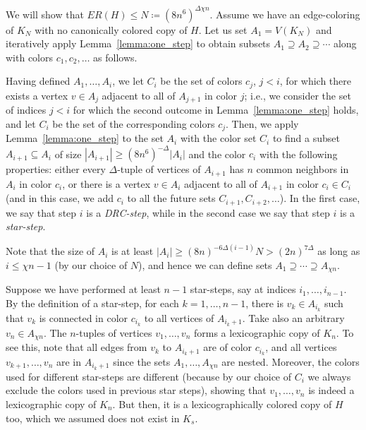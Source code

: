 \documentclass[a4paper,11pt]{article}
\makeatletter
\renewenvironment{proof}[1][\proofname] {\par\pushQED{\qed}\normalfont\topsep6\p@\@plus6\p@\relax\trivlist\item[\hskip\labelsep\bfseries#1\@addpunct{.}]\ignorespaces}{\popQED\endtrivlist\@endpefalse}
\theoremstyle{definition}
\makeatother
\begin{document}
\begin{proof}[Proof of Theorem~\ref{thm:upper bound non-bipartite}.]
We will show that $ER(H)\leq N \coloneqq (8n^6)^{\Delta \chi n}$. Assume we have an edge-coloring of $K_N$ with no canonically colored copy of $H$. Let us set $A_1=V(K_N)$ and iteratively apply Lemma~\ref{lemma:one_step} to obtain subsets $A_1\supseteq A_2\supseteq \cdots$ along with colors $c_1, c_2, \dots$ as follows.

Having defined $A_1, \dots, A_i$, we let $C_i$ be the set of colors $c_{j}$, $j< i$, for which there exists a vertex $v\in A_j$ adjacent to all of $A_{j+1}$ in color $j$; i.e., we consider the set of indices $j < i$ for which the second outcome in Lemma~\ref{lemma:one_step} holds, and let $C_i$ be the set of the corresponding colors $c_j$. Then, we apply Lemma~\ref{lemma:one_step} to the set $A_i$ with the color set $C_i$ to find a subset $A_{i+1}\subseteq A_i$ of size $|A_{i+1}|\geq (8n^6)^{-\Delta} |A_i|$ and the color $c_i$ with the following properties: either every $\Delta$-tuple of vertices of $A_{i+1}$ has $n$ common neighbors in $A_i$ in color $c_i$, or there is a vertex $v\in A_i$ adjacent to all of $A_{i+1}$ in color $c_i\in C_i$ (and in this case, we add $c_i$ to all the future sets $C_{i+1},C_{i+2},\dots$). In the first case, we say that step $i$ is a \textit{DRC-step}, while in the second case we say that step $i$ is a \textit{star-step}.

Note that the size of $A_i$ is at least 
$|A_i|\geq (8n)^{-6\Delta (i-1)} N>(2n)^{7\Delta}$ as long as $i\leq \chi n-1$ (by our choice of $N$), and hence we can define sets $A_1\supseteq\cdots\supseteq A_{\chi n}$.  

Suppose we have performed at least $n-1$ star-steps, say at indices $i_1, \dots, i_{n-1}$.
By the definition of a star-step, for each $k = 1,\dots,n-1$, there is $v_k \in A_{i_k}$ such that $v_k$ is connected in color $c_{i_k}$ to all vertices of $A_{i_k+1}$. Take also an arbitrary $v_n \in A_{\chi n}$.
The $n$-tuples of vertices $v_1, \dots, v_n$ forms a lexicographic copy of $K_n$. To see this, note that all edges from $v_k$ to $A_{i_k+1}$ are of color $c_{i_k}$, and all vertices $v_{k+1}, \dots, v_{n}$ are in $A_{i_k+1}$ since the sets $A_1, \dots, A_{\chi n}$ are nested. Moreover, the colors used for different star-steps are different (because by our choice of $C_i$ we always exclude the colors used in previous star steps), showing that $v_1, \dots, v_n$ is indeed a lexicographic copy of $K_n$. But then, it is a lexicographically colored copy of $H$ too, which we assumed does not exist in $K_s$.


\end{proof}
\end{document}
